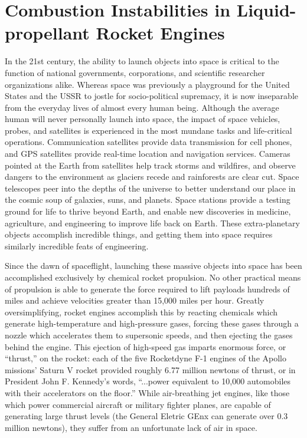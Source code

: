 \section{Combustion Instabilities in Liquid-propellant Rocket Engines}

In the 21st century, the ability to launch objects into space is critical to the function of national governments, corporations, and scientific researcher organizations alike. Whereas space was previously a playground for the United States and the USSR to jostle for socio-political supremacy, it is now inseparable from the everyday lives of almost every human being. Although the average human will never personally launch into space, the impact of space vehicles, probes, and satellites is experienced in the most mundane tasks and life-critical operations. Communication satellites provide data transmission for cell phones, and GPS satellites provide real-time location and navigation services. Cameras pointed at the Earth from satellites help track storms and wildfires, and observe dangers to the environment as glaciers recede and rainforests are clear cut. Space telescopes peer into the depths of the universe to better understand our place in the cosmic soup of galaxies, suns, and planets. Space stations provide a testing ground for life to thrive beyond Earth, and enable new discoveries in medicine, agriculture, and engineering to improve life back on Earth. These extra-planetary objects accomplish incredible things, and getting them into space requires similarly incredible feats of engineering.

Since the dawn of spaceflight, launching these massive objects into space has been accomplished exclusively by chemical rocket propulsion. No other practical means of propulsion is able to generate the force required to lift payloads hundreds of miles and achieve velocities greater than 15,000 miles per hour. Greatly oversimplifying, rocket engines accomplish this by reacting chemicals which generate high-temperature and high-pressure gases, forcing these gases through a nozzle which accelerates them to supersonic speeds, and then ejecting the gases behind the engine. This ejection of high-speed gas imparts enormous force, or ``thrust,'' on the rocket: each of the five Rocketdyne F-1 engines of the Apollo missions' Saturn V rocket provided roughly 6.77 million newtons of thrust, or in President John F. Kennedy's words, ``...power equivalent to 10,000 automobiles with their accelerators on the floor.'' While air-breathing jet engines, like those which power commercial aircraft or military fighter planes, are capable of generating large thrust levels (the General Eletric GEnx can generate over 0.3 million newtons), they suffer from an unfortunate lack of air in space.


